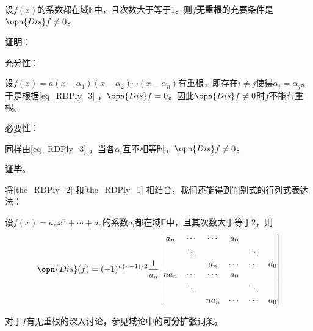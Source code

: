 \begin{theorem}{}\label{the_RDPly_1}
设$f(x)$的系数都在域$\mathbb{F}$中，且次数大于等于1。则$f$\textbf{无重根}的充要条件是$\opn{Dis}f\neq 0$。
\end{theorem}

\textbf{证明}：

充分性：

设$f(x)=a(x-\alpha_1)(x-\alpha_2)\cdots(x-\alpha_n)$有重根，即存在$i\neq j$使得$\alpha_i=\alpha_j$。于是根据\autoref{eq_RDPly_3} ，$\opn{Dis}f = 0$。因此$\opn{Dis}f\neq 0$时$f$不能有重根。

必要性：

同样由\autoref{eq_RDPly_3} ，当各$\alpha_i$互不相等时，$\opn{Dis}f\neq 0$。

\textbf{证毕}。


将\autoref{the_RDPly_2} 和\autoref{the_RDPly_1} 相结合，我们还能得到判别式的行列式表达法：

\begin{theorem}{}
设$f(x)=a_nx^n+\cdots+a_n$的系数$a_i$都在域$\mathbb{F}$中，且其次数大于等于2，则
\begin{equation}
\opn{Dis}(f) = (-1)^{n(n-1)/2}\frac{1}{a_n}
\begin{vmatrix}
a_n&\cdots&\cdots&a_0\\
&\ddots&&&\ddots\\
&&a_n&\cdots&\cdots&a_0\\
na_n&\cdots&\cdots&a_0\\
&\ddots&&&\ddots\\
&&na_n&\cdots&\cdots&a_0
\end{vmatrix}
\end{equation}
\end{theorem}

对于$f$有无重根的深入讨论，参见域论中的\textbf{可分扩张}词条。









